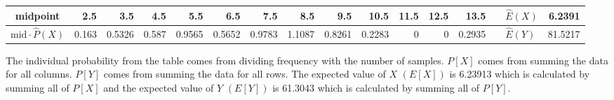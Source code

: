 \begin{table}[ht]
\begin{adjustbox}{width = \textwidth, center}
\begin{tabular}{|cc|r|r|r|r|r|r|r|r|r|r|r|r|r|r|r|}
            \multicolumn{2}{|c|}{\cellcolor[HTML]{FCE5CD}midpoint}                          & \cellcolor[HTML]{FCE5CD}2.5                    & \cellcolor[HTML]{FCE5CD}3.5                    & \cellcolor[HTML]{FCE5CD}4.5                    & \cellcolor[HTML]{FCE5CD}5.5                    & \cellcolor[HTML]{FCE5CD}6.5                    & \cellcolor[HTML]{FCE5CD}7.5                    & \cellcolor[HTML]{FCE5CD}8.5                    & \cellcolor[HTML]{FCE5CD}9.5                     & \cellcolor[HTML]{FCE5CD}10.5                    & \cellcolor[HTML]{FCE5CD}11.5                    & \cellcolor[HTML]{FCE5CD}12.5                    & \cellcolor[HTML]{FCE5CD}13.5                    & \multicolumn{1}{l|}{}                                                           & \multicolumn{1}{l|}{\cellcolor[HTML]{D9D9D9}$\widehat{E}(X)$}           & \cellcolor[HTML]{D9D9D9}6.2391                                                                   \\ \hline
            \multicolumn{2}{|c|}{\cellcolor[HTML]{FCE5CD}$\mathrm{mid}\cdot\widehat{P}(X)$} & \cellcolor[HTML]{FCE5CD}0.163                  & \cellcolor[HTML]{FCE5CD}0.5326                 & \cellcolor[HTML]{FCE5CD}0.587                  & \cellcolor[HTML]{FCE5CD}0.9565                 & \cellcolor[HTML]{FCE5CD}0.5652                 & \cellcolor[HTML]{FCE5CD}0.9783                 & \cellcolor[HTML]{FCE5CD}1.1087                 & \cellcolor[HTML]{FCE5CD}0.8261                  & \cellcolor[HTML]{FCE5CD}0.2283                  & \cellcolor[HTML]{FCE5CD}0                       & \cellcolor[HTML]{FCE5CD}0                       & \cellcolor[HTML]{FCE5CD}0.2935                  & \multicolumn{1}{l|}{}                                                           & \multicolumn{1}{l|}{\cellcolor[HTML]{D9D9D9}$\widehat{E}(Y)$}           & \cellcolor[HTML]{D9D9D9}81.5217                                                                  \\ \hline
        \end{tabular}
    \end{adjustbox}
\end{table}\newpage
The individual probability from the table comes from dividing frequency with the number of samples. $P[X]$ comes from summing the data for all columns. $P[Y]$ comes from summing the data for all rows. The expected value of $X$ $(E[X])$ is 6.23913 which is calculated by summing all of $P[X]$ and the expected value of $Y$ $(E[Y])$ is 61.3043 which is calculated by summing all of $P[Y]$.\\

